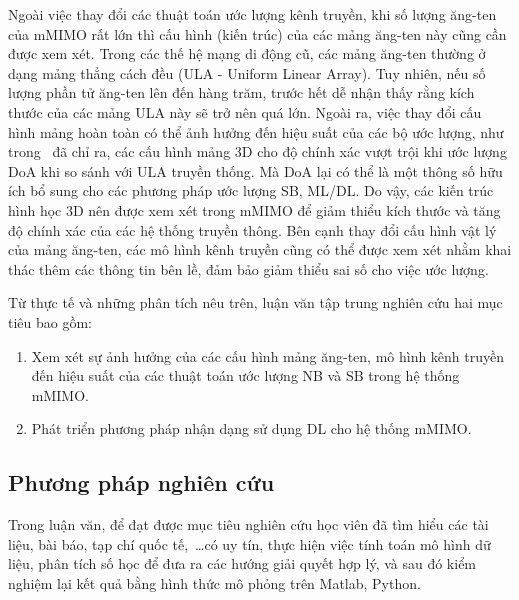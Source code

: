 Ngoài việc thay đổi các thuật toán ước lượng kênh truyền, khi số lượng ăng-ten của mMIMO rất lớn thì cấu hình (kiến trúc) của các mảng ăng-ten này cũng cần được xem xét. Trong các thế hệ mạng di động cũ, các mảng ăng-ten thường ở dạng mảng thẳng cách đều (ULA - Uniform Linear Array). Tuy nhiên, nếu số lượng phần tử ăng-ten lên đến hàng trăm, trước hết dễ nhận thấy rằng kích thước của các mảng ULA này sẽ trở nên quá lớn. Ngoài ra, việc thay đổi cấu hình mảng hoàn toàn có thể ảnh hưởng đến hiệu suất của các bộ ước lượng, như trong~\cite{POORMOHAMMAD2017} đã chỉ ra, các cấu hình mảng 3D cho độ chính xác vượt trội khi ước lượng DoA khi so sánh với ULA truyền thống. Mà DoA lại có thể là một thông số hữu ích bổ sung cho các phương pháp ước lượng SB, ML/DL. Do vậy, các kiến trúc hình học 3D nên được xem xét trong mMIMO để giảm thiểu kích thước và tăng độ chính xác của các hệ thống truyền thông. Bên cạnh thay đổi cấu hình vật lý của mảng ăng-ten, các mô hình kênh truyền cũng có thể được xem xét nhằm khai thác thêm các thông tin bên lề, đảm bảo giảm thiểu sai số cho việc ước lượng.

Từ thực tế và những phân tích nêu trên, luận văn tập trung nghiên cứu hai mục tiêu bao gồm:
\begin{enumerate}
    \item Xem xét sự ảnh hưởng của các cấu hình mảng ăng-ten, mô hình kênh truyền đến hiệu suất của các thuật toán ước lượng NB và SB trong hệ thống mMIMO.
    
    \item Phát triển phương pháp nhận dạng sử dụng DL cho hệ thống mMIMO.
\end{enumerate}
\vspace{0.5cm}

\subsection*{Phương pháp nghiên cứu}

Trong luận văn, để đạt được mục tiêu nghiên cứu học viên đã tìm hiểu các tài liệu, bài báo, tạp chí quốc tế,~\ldots có uy tín, thực hiện việc tính toán mô hình dữ liệu, phân tích số học để đưa ra các hướng giải quyết hợp lý, và sau đó kiểm nghiệm lại kết quả bằng hình thức mô phỏng trên Matlab, Python.

